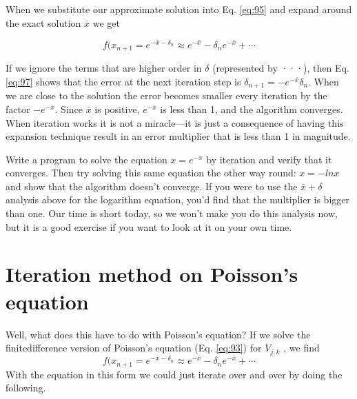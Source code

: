 When we substitute our approximate solution into 
Eq. \ref{eq:95} and 
expand around the exact solution $ \bar{x} $ we get

\begin{equation}\label{eq:97}
f(x_{n+1}=e^{-\bar{x}-\delta_{n}} \approx e^{-\bar{x}}-\delta_{n} e^{-\bar{x}}+\cdots
\end{equation}

If we ignore the terms that are higher order in $\delta$ (represented by ···), then Eq. \ref{eq:97}
shows that the error at the next iteration step is $\delta_{n+1} = −e^{−\bar{x}}\delta_n$. When we are close
to the solution the error becomes smaller every iteration by the factor $−e^{-\bar{x}}$. Since $\bar{x}$ is positive, $e^{-\bar{x}}$ is less than 1, and the algorithm converges. When iteration works
it is not a miracle—it is just a consequence of having this expansion technique
result in an error multiplier that is less than 1 in magnitude.

\begin{problem}\label{P9.1}
Write a program to solve the equation $x = e^{−x}$ by iteration and verify that
it converges. Then try solving this same equation the other way round:
$x = −ln x$ and show that the algorithm doesn\rq t converge. If you were to
use the $\bar{x} +\delta$ analysis above for the logarithm equation, you\rq d find that the
multiplier is bigger than one. Our time is short today, so we won\rq t make you
do this analysis now, but it is a good exercise if you want to look at it on
your own time.
\end{problem}

\section*{Iteration method on Poisson\rq s equation}
Well, what does this have to do with Poisson\rq s equation? If we solve the finitedifference version of Poisson\rq s equation (Eq. \ref{eq:93}) for $V_{j,k}$ , we find
\begin{equation}\label{eq:98}
f(x_{n+1}=e^{-\bar{x}-\delta_{n}} \approx e^{-\bar{x}}-\delta_{n} e^{-\bar{x}}+\cdots
\end{equation}
With the equation in this form we could just iterate over and over by doing the
following.

